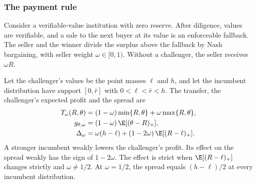 \subsubsection*{The payment rule}

Consider a verifiable-value institution with zero reserve. After diligence, values are verifiable, and a sale to
the next buyer at its value is an enforceable fallback. The seller and the winner divide the surplus above the
fallback by Nash bargaining, with seller weight \(\omega\in[0,1)\). Without a challenger, the seller receives
\(\omega R\).

\begin{proposition}\label{prop:payment}
Let the challenger's values be the point masses \(\ell\) and \(h\), and let the incumbent distribution have support
\([0,\bar r]\) with \(0<\ell<\bar r<h\). The transfer, the challenger's expected profit and the spread are
\[
\begin{aligned}
T_\omega(R,\theta)&=(1-\omega)\min\{R,\theta\}+\omega\max\{R,\theta\},\\
g_{\theta,\omega}&=(1-\omega)\,\E[(\theta-R)_+],\\
\Delta_\omega&=\omega(h-\ell)+(1-2\omega)\,\E[(R-\ell)_+].
\end{aligned}
\]
A stronger incumbent weakly lowers the challenger's profit. Its effect on the spread weakly has the sign of
\(1-2\omega\). The effect is strict when \(\E[(R-\ell)_+]\) changes strictly and \(\omega\ne1/2\). At \(\omega=1/2\), the
spread equals \((h-\ell)/2\) at every incumbent distribution.
\end{proposition}

